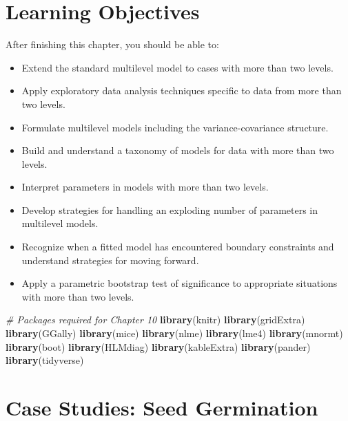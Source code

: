 \documentclass[
]{krantz}
\newenvironment{Shaded}{\begin{snugshade}}{\end{snugshade}}
\newcommand{\CommentTok}[1]{\textcolor[rgb]{0.37,0.37,0.37}{\textit{#1}}}
\newcommand{\KeywordTok}[1]{\textcolor[rgb]{0.27,0.27,0.27}{\textbf{#1}}}
\newcommand{\NormalTok}[1]{#1}
\providecommand{\tightlist}{%
  \setlength{\itemsep}{0pt}\setlength{\parskip}{0pt}}
\begin{document}
\hypertarget{learning-objectives-2}{%
\section{Learning Objectives}\label{learning-objectives-2}}

After finishing this chapter, you should be able to:

\begin{itemize}
\tightlist
\item
  Extend the standard multilevel model to cases with more than two levels.
\item
  Apply exploratory data analysis techniques specific to data from more than two levels.
\item
  Formulate multilevel models including the variance-covariance structure.
\item
  Build and understand a taxonomy of models for data with more than two levels.
\item
  Interpret parameters in models with more than two levels.
\item
  Develop strategies for handling an exploding number of parameters in multilevel models.
\item
  Recognize when a fitted model has encountered boundary constraints and understand strategies for moving forward.
\item
  Apply a parametric bootstrap test of significance to appropriate situations with more than two levels.
\end{itemize}

\begin{Shaded}
\begin{Highlighting}[]
\CommentTok{# Packages required for Chapter 10}
\KeywordTok{library}\NormalTok{(knitr)}
\KeywordTok{library}\NormalTok{(gridExtra)}
\KeywordTok{library}\NormalTok{(GGally)}
\KeywordTok{library}\NormalTok{(mice)}
\KeywordTok{library}\NormalTok{(nlme)}
\KeywordTok{library}\NormalTok{(lme4)}
\KeywordTok{library}\NormalTok{(mnormt)}
\KeywordTok{library}\NormalTok{(boot)}
\KeywordTok{library}\NormalTok{(HLMdiag)}
\KeywordTok{library}\NormalTok{(kableExtra)}
\KeywordTok{library}\NormalTok{(pander)}
\KeywordTok{library}\NormalTok{(tidyverse)}
\end{Highlighting}
\end{Shaded}

\hypertarget{cs:seeds}{%
\section{Case Studies: Seed Germination}\label{cs:seeds}}
\end{document}
